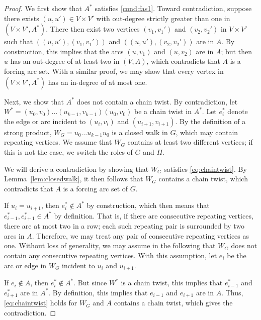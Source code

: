 \documentclass[12pt]{amsart}
\theoremstyle{plain}
\theoremstyle{definition}
\newcommand{\Owen}[1]{{{\color{purple} #1}}}
\begin{document}
\begin{proof}
We first show that $A^*$ satisfies \ref{cond:fas1}.  
Toward contradiction, suppose there exists $(u,u')\in V\times V'$ with out-degree strictly greater than one in $(V\times V', A^*)$. 
There then exist two vertices $(v_1,v_1')$ and  $ (v_2, v_2')$ in  $  V\times V'$ such that 
$ ((u,u'), (v_1,v_1'))$ and $ ((u,u'),(v_2, v_2')) $ are in $ A. $
By construction, this implies that the arcs $(u,v_1)$ and $ (u,v_2)$ are in $ A$; but then $u$ has an out-degree of at least two in $(V, A)$, which contradicts that $A$ is a forcing arc set. 
With a similar proof, we may show that every vertex in $(V\times V', A^*)$ has an in-degree of at most one. 

Next, we show that $A^*$ does not contain a chain twist. 
By contradiction, let $W^* = (u_0, v_0)\dots (u_{k-1}, v_{k-1})(u_0, v_0)$ be a chain twist in $A^*$. 
Let $e_i^*$ denote the edge or arc incident to $(u_i, v_i)$ and $(u_{i+1}, v_{i+1})$.
By the definition of a strong product,  $W_G = u_0\dots u_{k-1}u_0$ is a closed walk in $G$, which may contain repeating vertices. We assume that $W_G$ contains at least two different vertices; if this is not the case, we switch the roles of $G$ and $H$. 

We will {derive a contradiction by showing} that $W_G$ satisfies \eqref{eq:chaintwist}. By Lemma~\ref{lem:closedwalk}, it then follows that $W_G$ contains a chain twist, which contradicts that $A$ is a forcing arc set of $G$. 

If $u_i = u_{i+1}$, then $e_i^*\not\in A^*$ by construction, which then means that $e_{i-1}^*, e_{i+1}^*\in A^*$ by definition.  
That is, if there are consecutive repeating vertices, there are at most two in a row; each such repeating pair is surrounded by two arcs in $A$. Therefore, we may treat any pair of consecutive repeating vertices as one. {Without loss of generality,} we may assume in the following that $W_G$ does not contain any consecutive repeating vertices.  With this assumption, let $e_i$ be the arc or edge in $W_G$ incident to $u_i$ and $u_{i+1}$.


If $e_i\not\in A$, then $e_i^*\not\in A^*$. But since $W^*$ is a chain twist, this implies that $e_{i-1}^*$ and $e_{i+1}^*$ are in $A^*$. By definition, this implies that $e_{i-1}$ and $e_{i+1}$ are in $A$. Thus, \eqref{eq:chaintwist} holds for $W_G$ and $A$ contains a chain twist, which gives the contradiction. 
\end{proof}
\end{document}
